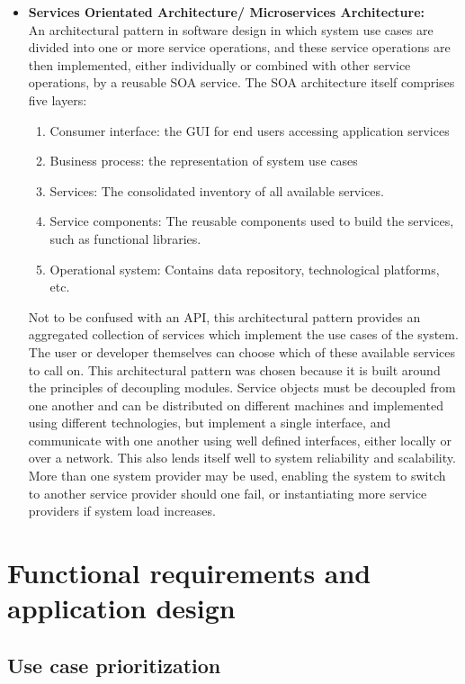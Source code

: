 \documentclass[a4paper,10pt]{article}
\begin{document}
\begin{itemize}
		\item \textbf{Services Orientated Architecture/ Microservices Architecture:}\\
		An architectural pattern in software design in which system use cases are divided into one or more service operations, and these service operations are then implemented, either individually or combined with other service operations, by a reusable SOA service. The SOA architecture itself comprises five layers:
		\begin{enumerate}
			\item Consumer interface: the GUI for end users accessing application services
			\item Business process: the representation of system use cases
			\item Services: The consolidated inventory of all available services.
			\item Service components: The reusable components used to build the services, such as functional libraries.
			\item Operational system: Contains data repository, technological platforms, etc.
		\end{enumerate}
		Not to be confused with an API, this architectural pattern provides an aggregated collection of services which implement the use cases of the system. The user or developer themselves can choose which of these available services to call on. This architectural pattern was chosen because it is built around the principles of decoupling modules. Service objects must be decoupled from one another and can be distributed on different machines and implemented using different technologies, but implement a single interface, and communicate with one another using well defined interfaces, either locally or over a network. This also lends itself well to system reliability and scalability. More than one system provider may be used, enabling the system to switch to another service provider should one fail, or instantiating more service providers if system load increases.
	\end{itemize}
\clearpage
\section{Functional requirements and application design}
\subsection{Use case prioritization}
\end{document}
